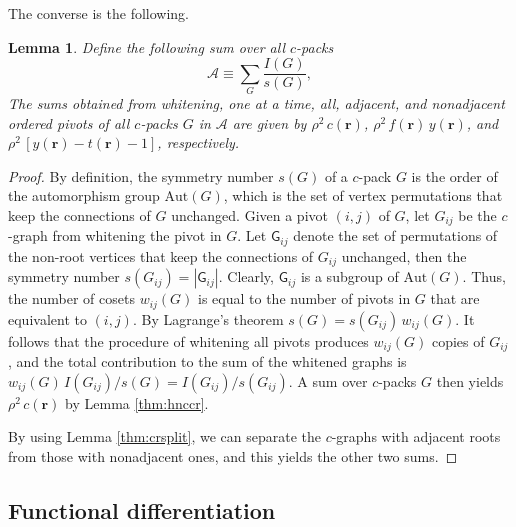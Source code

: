 \documentclass[preprint]{revtex4-1}
\newtheorem{lemm}[thrm]{Lemma}
\newcommand{\vct}[1]{\mathbf{#1}}
\providecommand{\vr}{} %
\renewcommand{\vr}{\vct{r}}
\newcommand{\A}{\mathcal{A}}
\newcommand{\G}{\mathsf{G}}
\newcommand{\Aut}{\mathrm{Aut}}
\begin{document}


The converse is the following.


\begin{lemm}
Define the following sum over all $c$-packs
\begin{equation}
  \A \equiv \sum_G \frac{ I(G) }{ s(G) },
  \label{eq:Adef}
\end{equation}
The sums obtained from whitening,
one at a time,
all,
adjacent,
and nonadjacent
ordered pivots
of all $c$-packs $G$ in $\A$
are given by
$\rho^2 \, c(\vr)$,
$\rho^2 \, f(\vr) \, y(\vr)$,
and
$\rho^2 \, [y(\vr) - t(\vr) - 1]$,
respectively.
\label{thm:whitenAhnc}
\end{lemm}



\begin{proof}
By definition,
  the symmetry number $s(G)$
  of a $c$-pack $G$
  is the order of the automorphism group $\Aut(G)$,
  which is the set of vertex permutations
  that keep the connections of $G$ unchanged.
%
Given a pivot $(i, j)$ of $G$,
  let $G_{ij}$ be the $c$-graph
  from whitening the pivot in $G$.
%
Let $\G_{ij}$
  denote the set of permutations of the non-root vertices
  that keep the connections of $G_{ij}$ unchanged,
then the symmetry number $s(G_{ij}) = |\G_{ij}|$.
%
Clearly, $\G_{ij}$ is a subgroup of $\Aut(G)$.
%
%
Thus, the number of cosets $w_{ij}(G)$
is equal to the number of pivots in $G$
that are equivalent to $(i, j)$.
%
By Lagrange's theorem $s(G) = s(G_{ij}) \, w_{ij}(G)$.
%
It follows that the procedure of whitening all pivots
produces $w_{ij}(G)$ copies of $G_{ij}$,
and the total contribution
to the sum of the whitened graphs
is $w_{ij}(G) \, I(G_{ij})/s(G) = I(G_{ij})/s(G_{ij})$.
%
A sum over $c$-packs $G$
then yields $\rho^2 \, c(\vr)$ by Lemma \ref{thm:hnccr}.

By using Lemma \ref{thm:crsplit},
  we can separate the $c$-graphs with adjacent roots
  from those with nonadjacent ones,
  and this yields the other two sums.
\end{proof}



\subsection{Functional differentiation}
\end{document}
